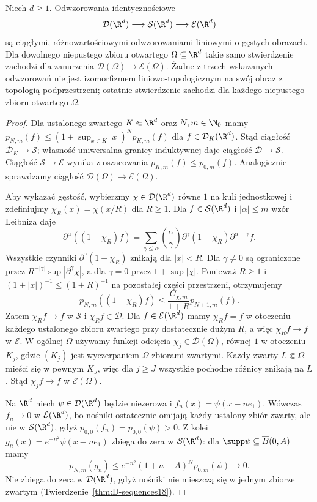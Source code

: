 \begin{twierdzenie}
\label{thm:zanurzenia25}
Niech $d\ge1$. Odwzorowania identycznościowe
\[
 \mathcal D(\R^d)\longrightarrow\mathcal S(\R^d)
 \longrightarrow\mathcal E(\R^d)
\]
są ciągłymi, różnowartościowymi odwzorowaniami liniowymi o gęstych
obrazach. Dla dowolnego niepustego zbioru otwartego $\Omega\subseteq\R^d$
takie samo stwierdzenie zachodzi dla zanurzenia
$\mathcal D(\Omega)\to\mathcal E(\Omega)$.
Żadne z trzech wskazanych odwzorowań nie jest
izomorfizmem liniowo-topologicznym na swój obraz z topologią
podprzestrzeni; ostatnie stwierdzenie zachodzi dla każdego
niepustego zbioru otwartego $\Omega$.
\end{twierdzenie}
\begin{proof}
Dla ustalonego zwartego $K\Subset\R^d$ oraz $N,m\in\N_0$
mamy $p_{N,m}(f)\le (1+\sup_{x\in K}|x|)^N p_{K,m}(f)$
dla $f\in\mathcal D_K(\R^d)$. Stąd ciągłość
$\mathcal D_K\to\mathcal S$; własność uniwersalna granicy
induktywnej daje ciągłość $\mathcal D\to\mathcal S$.
Ciągłość $\mathcal S\to\mathcal E$ wynika z oszacowania
$p_{K,m}(f)\le p_{0,m}(f)$. Analogicznie sprawdzamy
ciągłość $\mathcal D(\Omega)\to\mathcal E(\Omega)$.

Aby wykazać gęstość, wybierzmy $\chi\in\mathcal D(\R^d)$
równe $1$ na kuli jednostkowej i zdefiniujmy
$\chi_R(x)=\chi(x/R)$ dla $R\ge1$. Dla $f\in\mathcal S(\R^d)$ i $|\alpha|\le m$
wzór Leibniza daje
\[
 \partial^\alpha((1-\chi_R)f)
 =\sum_{\gamma\le\alpha}\binom{\alpha}{\gamma}
 \partial^\gamma(1-\chi_R)\partial^{\alpha-\gamma}f.
\]
Wszystkie czynniki $\partial^\gamma(1-\chi_R)$
znikają dla $|x|<R$. Dla $\gamma\ne0$ są ograniczone
przez $R^{-|\gamma|}\sup|\partial^\gamma\chi|$,
a dla $\gamma=0$ przez $1+\sup|\chi|$.
Ponieważ $R\ge1$ i $(1+|x|)^{-1}\le(1+R)^{-1}$
na pozostałej części przestrzeni, otrzymujemy
\[
 p_{N,m}((1-\chi_R)f)
 \le \frac{C_{\chi,m}}{1+R}p_{N+1,m}(f).
\]
Zatem $\chi_Rf\to f$ w $\mathcal S$ i $\chi_Rf\in\mathcal D$.
Dla $f\in\mathcal E(\R^d)$ mamy $\chi_Rf=f$ w otoczeniu
każdego ustalonego zbioru zwartego przy dostatecznie dużym $R$,
a więc $\chi_Rf\to f$ w $\mathcal E$. W ogólnej
$\Omega$ używamy funkcji odcięcia $\chi_j\in\mathcal D(\Omega)$,
równej $1$ w otoczeniu $K_j$, gdzie $(K_j)$ jest
wyczerpaniem $\Omega$ zbiorami zwartymi. Każdy zwarty $L\Subset\Omega$ mieści się w pewnym $K_J$,
więc dla $j\ge J$ wszystkie pochodne różnicy znikają na $L$.
Stąd $\chi_j f\to f$ w $\mathcal E(\Omega)$.

Na $\R^d$ niech $\psi\in\mathcal D(\R^d)$ będzie niezerowa
i $f_n(x)=\psi(x-ne_1)$. Wówczas $f_n\to0$ w
$\mathcal E(\R^d)$, bo nośniki ostatecznie omijają każdy
ustalony zbiór zwarty, ale nie w $\mathcal S(\R^d)$,
gdyż $p_{0,0}(f_n)=p_{0,0}(\psi)>0$.
Z kolei $g_n(x)=e^{-n^2}\psi(x-ne_1)$ zbiega do zera w
$\mathcal S(\R^d)$: dla $\supp\psi\subseteq\overline B(0,A)$
mamy
\[
 p_{N,m}(g_n)\le e^{-n^2}(1+n+A)^N p_{0,m}(\psi)
 \longrightarrow0.
\]
Nie zbiega do zera w $\mathcal D(\R^d)$, gdyż nośniki
nie mieszczą się w jednym zbiorze zwartym
(Twierdzenie~\ref{thm:D-sequences18}).


\end{proof}

